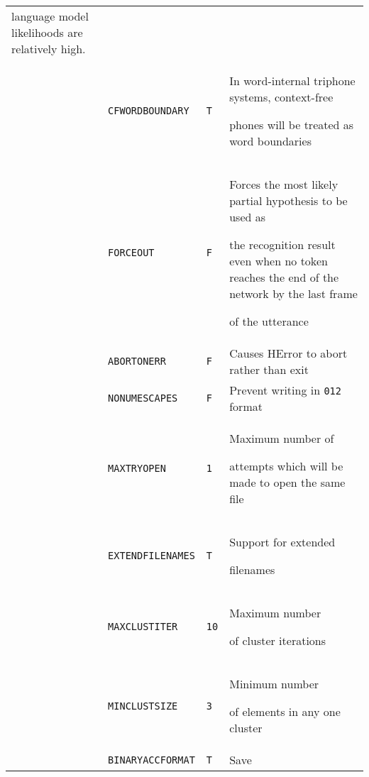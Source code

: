 \begin{center}
\begin{supertabular}{|p{1.8cm}|l|l|p{6.6cm}|}
  language model likelihoods are relatively high. \\  


  & \texttt{CFWORDBOUNDARY} & \texttt{T} & In word-internal triphone systems, context-free 


  phones will be treated as word boundaries \\ \hline









  & \texttt{FORCEOUT} & \texttt{F} & Forces the most likely partial hypothesis to be used as


  the recognition result even when no token reaches the end of the network by the last frame


  of the utterance \\ \hline







  & \texttt{ABORTONERR} & \texttt{F} & Causes HError to abort rather than exit \\ 


 & \texttt{NONUMESCAPES} & \texttt{F} & Prevent writing in \verb+012+ format \\ 


  & \texttt{MAXTRYOPEN} & \texttt{1} & Maximum number of


  attempts which will be made to open the same file \\ 


  & \texttt{EXTENDFILENAMES} & \texttt{T} & Support for extended


  filenames \\ \hline










  & \texttt{MAXCLUSTITER} & \texttt{10} & Maximum number


  of cluster iterations \\ 


 & \texttt{MINCLUSTSIZE} & \texttt{3} & Minimum number


  of elements in any one cluster \\ 


  & \texttt{BINARYACCFORMAT} & \texttt{T} & Save



\end{supertabular}
\end{center}
